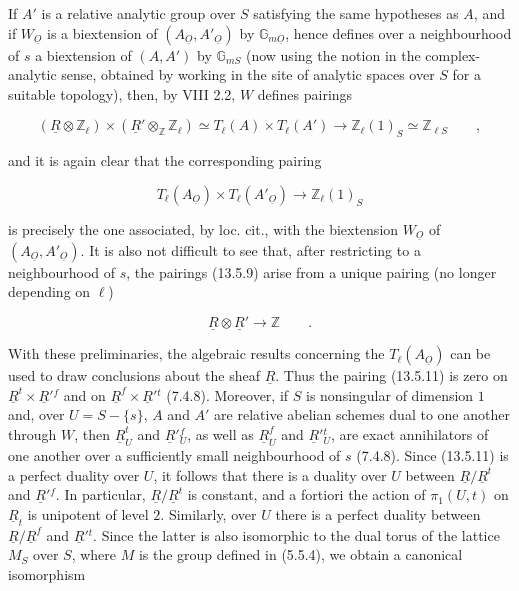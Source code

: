 \noindent
If $A'$ is a relative analytic group over $S$ satisfying the same
hypotheses as $A$, and if $W_{\underline O}$ is a biextension of
$(A_{\underline O},A'_{\underline O})$ by
$\mathbb G_{m\underline O}$, hence defines over a neighbourhood of $s$
a biextension of $(A,A')$ by $\mathbb G_{mS}$ (now using the notion in
the complex-analytic sense, obtained by working in the site of analytic
spaces over $S$ for a suitable topology), then, by VIII 2.2, $W$
defines pairings

\begin{equation}\tag{13.5.9}
 (\underline R\otimes\mathbb Z_\ell)\times
 (\underline R'\otimes_{\mathbb Z}\mathbb Z_\ell)
 \simeq T_\ell(A)\times T_\ell(A')
 \longrightarrow\mathbb Z_\ell(1)_S
 \simeq\mathbb Z_{\ell S}\qquad ,
\end{equation}

\noindent
and it is again clear that the corresponding pairing

\begin{equation}\tag{13.5.10}
 T_\ell(A_{\underline O})\times T_\ell(A'_{\underline O})
 \longrightarrow\mathbb Z_\ell(1)_S
\end{equation}

\noindent
is precisely the one associated, by loc. cit., with the biextension
$W_{\underline O}$ of $(A_{\underline O},A'_{\underline O})$.  It is
also not difficult to see that, after restricting to a neighbourhood
of $s$, the pairings (13.5.9) arise from a unique pairing (no longer
depending on $\ell$)

\begin{equation}\tag{13.5.11}
 \underline R\otimes\underline R'\longrightarrow\mathbb Z
 \qquad .
\end{equation}

\noindent
With these preliminaries, the algebraic results concerning the
$T_\ell(A_{\underline O})$ can be used to draw conclusions about the
sheaf $\underline R$.  Thus the pairing (13.5.11) is zero on
$\underline R^t\times\underline R'{}^f$ and on
$\underline R^f\times\underline R'{}^t$ (7.4.8).  Moreover, if $S$ is
nonsingular of dimension $1$ and, over $U=S-\{s\}$, $A$ and $A'$ are
relative abelian schemes dual to one another through $W$, then
$\underline R^t_U$ and $\underline R'{}^f_U$, as well as
$\underline R^f_U$ and $\underline R'{}^t_U$, are exact annihilators of
one another over a sufficiently small neighbourhood of $s$ (7.4.8).
Since (13.5.11) is a perfect duality over $U$, it follows that there is
a duality over $U$ between $\underline R/\underline R^t$ and
$\underline R'{}^f$.  In particular,
$\underline R/\underline R^t$ is constant, and a fortiori the action of
$\pi_1(U,t)$ on $\underline R_t$ is unipotent of level $2$.  Similarly,
over $U$ there is a perfect duality between
$\underline R/\underline R^f$ and $\underline R'{}^t$.  Since the
latter is also isomorphic to the dual torus of the lattice $M_S$ over
$S$, where $M$ is the group defined in (5.5.4), we obtain a canonical
isomorphism

